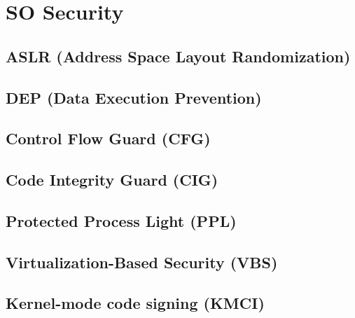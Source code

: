 \section{SO Security}

\subsection{ASLR (Address Space Layout Randomization)}

\subsection{DEP (Data Execution Prevention)}

\subsection{Control Flow Guard (CFG)}

\subsection{Code Integrity Guard (CIG)}

\subsection{Protected Process Light (PPL)}

\subsection{Virtualization-Based Security (VBS)}

\subsection{Kernel-mode code signing (KMCI)}